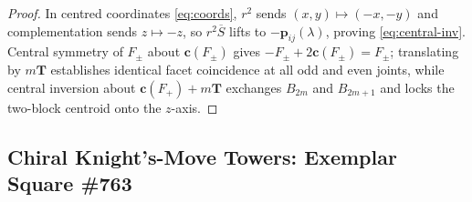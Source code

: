 \begin{proof}
In centred coordinates \eqref{eq:coords}, $r^2$ sends $(x,y)\mapsto(-x,-y)$ and complementation sends $z\mapsto-z$, so $r^2\overline S$ lifts to $-\mathbf p_{ij}(\lambda)$, proving \eqref{eq:central-inv}. Central symmetry of $F_\pm$ about $\mathbf c(F_\pm)$ gives $-F_\pm + 2\mathbf c(F_\pm)=F_\pm$; translating by $m\mathbf T$ establishes identical facet coincidence at all odd and even joints, while central inversion about $\mathbf c(F_+)+m\mathbf T$ exchanges $B_{2m}$ and $B_{2m+1}$ and locks the two-block centroid onto the $z$-axis.
\end{proof}

\subsection{Chiral Knight's-Move Towers: Exemplar Square \#763}

